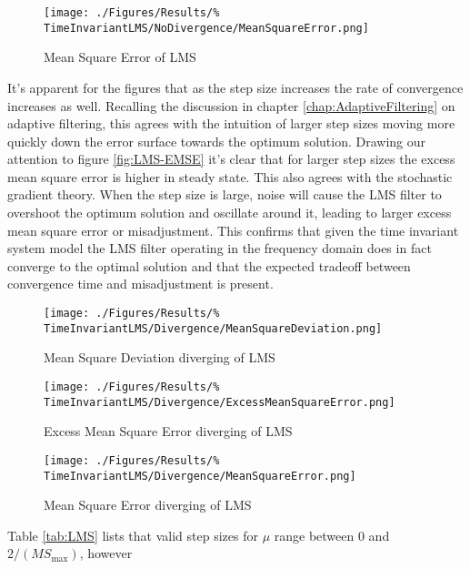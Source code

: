 \begin{figure}[ht]
	\centering
	\texttt{[image: ./Figures/Results/\%
	TimeInvariantLMS/NoDivergence/MeanSquareError.png]}
	\captionsetup{width=0.75\linewidth}
	\caption{Mean Square Error of LMS}
	\label{fig:LMS-MSE}
\end{figure}
It's apparent for the figures that as the step size increases the %
rate of convergence increases as well. Recalling the discussion in %
chapter \ref{chap:AdaptiveFiltering} on adaptive filtering, this %
agrees with the intuition of larger step sizes moving more quickly %
down the error surface towards the optimum solution. %
Drawing our attention to figure \ref{fig:LMS-EMSE} it's clear that %
for larger step sizes the excess mean square error is higher %
in steady state. This also agrees with the stochastic gradient %
theory. When the step size is large, noise will cause %
the LMS filter to overshoot the optimum solution and oscillate %
around it, leading to larger excess mean square error or %
misadjustment. This confirms that given the time invariant system %
model the LMS filter operating in the frequency domain does %
in fact converge to the optimal solution and that %
the expected tradeoff between convergence time and misadjustment is %
present.
\begin{figure}[ht]
	\centering
	\begin{minipage}{0.49\textwidth}
		\texttt{[image: ./Figures/Results/\%
		TimeInvariantLMS/Divergence/MeanSquareDeviation.png]}
		\captionsetup{width=0.75\linewidth}
		\caption{Mean Square Deviation diverging of LMS}
		\label{fig:LMS-MSD-Diverge}
	\end{minipage}
	\begin{minipage}{0.49\textwidth}
		\texttt{[image: ./Figures/Results/\%
		TimeInvariantLMS/Divergence/ExcessMeanSquareError.png]}
		\captionsetup{width=0.75\linewidth}
		\caption{Excess Mean Square Error diverging of LMS}
		\label{fig:LMS-EMSE-Diverge}
	\end{minipage}
\end{figure}
\begin{figure}[ht]
	\centering
	\texttt{[image: ./Figures/Results/\%
	TimeInvariantLMS/Divergence/MeanSquareError.png]}
	\captionsetup{width=0.75\linewidth}
	\caption{Mean Square Error diverging of LMS}
	\label{fig:LMS-MSE-Diverge}
\end{figure}
Table \ref{tab:LMS} lists that valid step sizes for $\mu$ range %
between $0$ and $2/(M S_{\text{max}})$, however %
